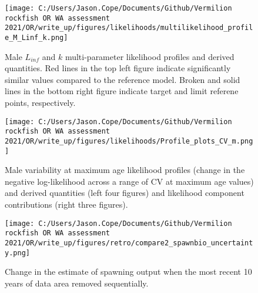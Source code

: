 \documentclass[11pt,
  english,
  a4paper,
]{article}
\begin{document}
\begin{figure}
\centering
\texttt{[image: C:/Users/Jason.Cope/Documents/Github/Vermilion rockfish OR WA assessment 2021/OR/write\_up/figures/likelihoods/multilikelihood\_profile\_M\_Linf\_k.png]}
\caption{Male {\(L_{inf}\)\leavevmode\tagmcend\tagstructend} and {\(k\)\leavevmode\tagmcend\tagstructend} multi-parameter likelihood profiles and derived quantities. Red lines in the top left figure indicate significantly similar values compared to the reference model. Broken and solid lines in the bottom right figure indicate target and limit referene points, respectively.\label{fig:Linf_k_m-profile}}
\end{figure}

\tagmcend\tagstructend


\begin{figure}
\centering
\texttt{[image: C:/Users/Jason.Cope/Documents/Github/Vermilion rockfish OR WA assessment 2021/OR/write\_up/figures/likelihoods/Profile\_plots\_CV\_m.png]}
\caption{Male variability at maximum age likelihood profiles (change in the negative log-likelihood across a range of CV at maximum age values) and derived quantities (left four figures) and likelihood component contributions (right three figures).\label{fig:CVold_m-profile-combo}}
\end{figure}

\tagmcend\tagstructend


\begin{figure}
\centering
\texttt{[image: C:/Users/Jason.Cope/Documents/Github/Vermilion rockfish OR WA assessment 2021/OR/write\_up/figures/retro/compare2\_spawnbio\_uncertainty.png]}
\caption{Change in the estimate of spawning output when the most recent 10 years of data area removed sequentially.\label{fig:retro-ssb}}
\end{figure}
\end{document}
